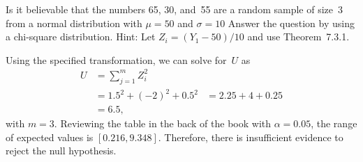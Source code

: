 \begin{problem}
  Is it believable that the numbers 65, 30, and~55 are a random sample of size~3 from a normal distribution with ${\mu = 50}$ and ${\sigma = 10}$ Answer the question by using a chi-square distribution. \textnormal{Hint: Let ${Z_i = (Y_1 - 50)/10}$ and use Theorem~7.3.1}.
\end{problem}

Using the specified transformation, we can solve for~$U$ as
\begin{align}
  U &= \sum_{j=1}^{m} Z_i^2 \\
    &= 1.5^2 + (-2)^2 + 0.5^2
    &= 2.25 + 4 + 0.25 \\
    &= 6.5 \text{,}
\end{align}
\noindent
with ${m=3}$.  Reviewing the table in the back of the book with ${\alpha = 0.05}$, the range of expected values is ${[0.216, 9.348]}$.  Therefore, there is insufficient evidence to reject the null hypothesis.
